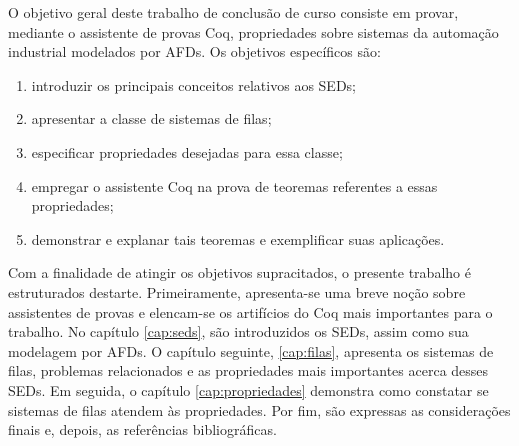 O objetivo geral deste trabalho de conclusão de curso consiste em provar, mediante o assistente de provas Coq, propriedades sobre sistemas da automação industrial modelados por AFDs. Os objetivos específicos são: \begin{enumerate}
	\item introduzir os principais conceitos relativos aos SEDs;
	\item apresentar a classe de sistemas de filas;
	\item especificar propriedades desejadas para essa classe;
	\item empregar o assistente Coq na prova de teoremas referentes a essas propriedades;
	\item demonstrar e explanar tais teoremas e exemplificar suas aplicações. 
\end{enumerate}

Com a finalidade de atingir os objetivos supracitados, o presente trabalho é estruturados destarte. Primeiramente, apresenta-se uma breve noção sobre assistentes de provas e elencam-se os artifícios do Coq mais importantes para o trabalho. No capítulo \ref{cap:seds}, são introduzidos os SEDs, assim como sua modelagem por AFDs. O capítulo seguinte, \ref{cap:filas}, apresenta os sistemas de filas, problemas relacionados e as propriedades mais importantes acerca desses SEDs. Em seguida, o capítulo \ref{cap:propriedades} demonstra como constatar se sistemas de filas atendem às propriedades. Por fim, são expressas as considerações finais e, depois, as referências bibliográficas.
